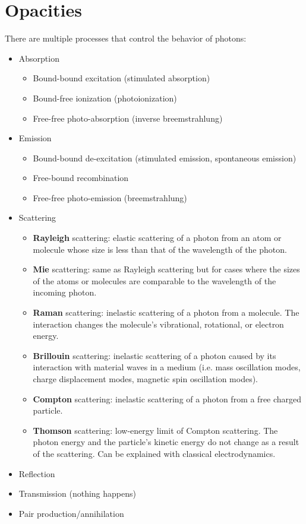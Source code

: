 \documentclass[a4paper,11pt]{report}
\begin{document}
\chapter{Opacities}
There are multiple processes that control the behavior of photons:
\begin{itemize}
    \item Absorption 
    \begin{itemize}
        \item Bound-bound excitation (stimulated absorption)
        \item Bound-free ionization (photoionization)
        \item Free-free photo-absorption (inverse breemstrahlung)
    \end{itemize}
    \item Emission 
    \begin{itemize}
        \item Bound-bound de-excitation (stimulated emission, spontaneous emission)
        \item Free-bound recombination
        \item Free-free photo-emission (breemstrahlung)
    \end{itemize}
    \item Scattering
    \begin{itemize}
        \item \textbf{Rayleigh} scattering: elastic scattering of a photon from an atom or molecule whose size is less than that of the wavelength of the photon. 
        \item \textbf{Mie} scattering: same as Rayleigh scattering but for cases where the sizes of the atoms or molecules are comparable to the wavelength of the incoming photon.
        \item \textbf{Raman} scattering: inelastic scattering of a photon from a molecule. The interaction changes the molecule's vibrational, rotational, or electron energy.
        \item \textbf{Brillouin} scattering: inelastic scattering of a photon caused by its interaction with material waves in a medium (i.e. mass oscillation modes, charge displacement modes, magnetic spin oscillation modes). 
        \item \textbf{Compton} scattering: inelastic scattering of a photon from a free charged particle. 
        \item \textbf{Thomson} scattering: low-energy limit of Compton scattering. The photon energy and the particle's kinetic energy do not change as a result of the scattering. Can be explained with classical electrodynamics.
    \end{itemize}
    \item Reflection
    \item Transmission (nothing happens)
    \item Pair production/annihilation
\end{itemize}
\end{document}
